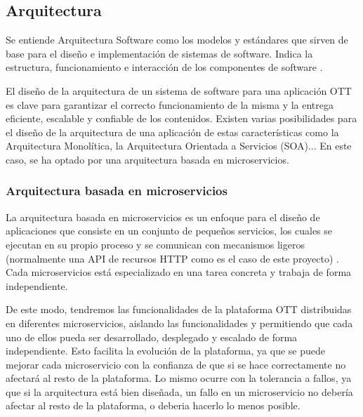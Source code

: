 \subsection{Arquitectura}
\label{subsec:fundamentos_teoricos_arquitectura}

Se entiende Arquitectura Software como los modelos y estándares que sirven de base
para el diseño e implementación de sistemas de software. Indica la estructura, funcionamiento
e interacción de los componentes de software \cite{ArqSoftware}.

El diseño de la arquitectura de un sistema de software para una aplicación OTT es clave para 
garantizar el correcto funcionamiento de la misma y la entrega eficiente, escalable y confiable 
de los contenidos. Existen varias posibilidades para el diseño de la arquitectura de una aplicación
de estas características como la Arquitectura Monolítica, la Arquitectura Orientada a Servicios (SOA)...
En este caso, se ha optado por una arquitectura basada en microservicios. 

\subsubsection{Arquitectura basada en microservicios}
\label{subsec:fundamentos_teoricos_arquitectura_microservicios}

La arquitectura basada en microservicios es un enfoque para el diseño de aplicaciones que consiste en
un conjunto de pequeños servicios, los cuales se ejecutan en su propio proceso y se comunican con 
mecanismos ligeros (normalmente una API de recursos HTTP como es el caso de este proyecto) \cite{Microservices}.
Cada microservicios está especializado en una tarea concreta y trabaja de forma independiente. 

De este modo, tendremos las funcionalidades de la plataforma OTT distribuidas en diferentes microservicios,
aislando las funcionalidades y permitiendo que cada uno de ellos pueda ser desarrollado, desplegado y
escalado de forma independiente. Esto facilita la evolución de la plataforma, ya que se puede mejorar 
cada microservicio con la confianza de que si se hace correctamente no afectará al resto de la plataforma.
Lo mismo ocurre con la tolerancia a fallos, ya que si la arquitectura está bien diseñada, un fallo en un
microservicio no debería afectar al resto de la plataforma, o deberia hacerlo lo menos posible.

